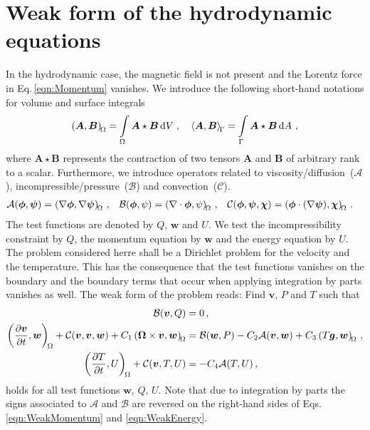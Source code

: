 \section{Weak form of the hydrodynamic equations}
In the hydrodynamic case, the magnetic field is not present and the Lorentz force in Eq.\,\eqref{eqn:Momentum} vanishes. We introduce the following short-hand notations for volume and surface integrals
\begin{equation*}
	\left(\bm A, \bm B\right)_{\!{\Omega}} = \int\limits_{\Omega} \bm A \star \bm B\, \mathrm{d}V \; , \quad
	\left\langle\bm A, \bm B\right\rangle_{\!{\Gamma}}  = \int\limits_{\Gamma} \bm A \star \bm B\, \mathrm{d}A \ ,
\end{equation*}
where $\bm A \star \bm B$ represents the contraction of two tensors $\bm A$ and $\bm B$ of arbitrary rank to a scalar. Furthermore, we introduce operators related to viscosity/diffusion~($\mathcal{A}$), incompressible/pressure~($\mathcal{B}$) and convection~($\mathcal{C}$).
\begin{align*}
\begin{aligned}
	\mathcal{A}(\bm{\phi}, \bm{\psi})&=\left(\nabla\bm{\phi}, \nabla\bm{\psi}\right)_{\!{\Omega}}\,, &
	\mathcal{B}(\bm{\phi}, \psi)&=\left(\nabla\cdot\bm{\phi}, \psi\right)_{\!{\Omega}}\,, &
	\mathcal{C}(\bm{\phi}, \bm{\psi}, \bm{\chi})&=\left(\bm{\phi} \cdot (\nabla\bm{\psi}), \bm{\chi}\right)_{\!{\Omega}}\,.
\end{aligned}
\end{align*}
The test functions are denoted by $Q$, $\bm{w}$ and $U$. We test the incompressibility constraint by $Q$, the momentum equation by $\bm{w}$ and the energy equation by $U$. The problem considered herre shall be a Dirichlet problem for the velocity and the temperature. This has the consequence that the test functions vanishes on the boundary and the boundary terms that occur when applying integration by parts vanishes as well. The weak form of the problem reads: Find $\bm{v}$, $P$ and $T$ such that
\begin{align}
	\mathcal{B}(\bm{v}, Q)&=0\,,\label{eqn:WeakIncompressibility} \\
	\left(\frac{\partial \bm{v}}{\partial t}, \bm{w}\right)_{\!{\Omega}}+\mathcal{C}(\bm{v}, \bm{v}, \bm{w})+C_1\left(\bm{\Omega}\times\bm{v}, \bm{w}\right)_{\!{\Omega}}&=\mathcal{B}(\bm{w}, P)-C_2\mathcal{A}(\bm{v}, \bm{w})+C_3\left(T\bm{g}, \bm{w}\right)_{\!{\Omega}}\,,\label{eqn:WeakMomentum}\\
	\left(\frac{\partial T}{\partial t}, U\right)_{\!{\Omega}}+\mathcal{C}(\bm{v}, T, U)&=-C_4\mathcal{A}(T, U)\,,
	\label{eqn:WeakEnergy}
\end{align}
holds for all test functions $\bm{w}$, $Q$, $U$. Note that due to integration by parts the signs associated to $\mathcal{A}$ and $\mathcal{B}$ are reversed on the right-hand sides of Eqs.\,\eqref{eqn:WeakMomentum} and \eqref{eqn:WeakEnergy}.

